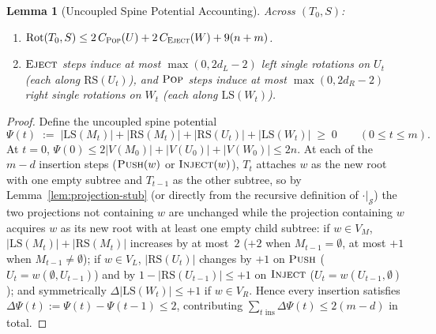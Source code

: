 \documentclass[11pt]{article}
\newtheorem{lemma}[theorem]{Lemma}
\theoremstyle{definition}
\theoremstyle{remark}
\newcommand{\LS}{\mathrm{LS}}
\newcommand{\RS}{\mathrm{RS}}
\newcommand{\Rot}{\mathrm{Rot}}
\newcommand{\PUSH}{\textnormal{\scshape Push}}
\newcommand{\POP}{\textnormal{\scshape Pop}}
\newcommand{\INJECT}{\textnormal{\scshape Inject}}
\newcommand{\EJECT}{\textnormal{\scshape Eject}}
\begin{document}
\begin{lemma}[Uncoupled Spine Potential Accounting]
\label{lem:spine-accounting}
Across $(T_0, S)$:
\begin{enumerate}[label=(\arabic*)]
  \item $\Rot(T_0, S) \le 2\,C_{\POP}(U) + 2\,C_{\EJECT}(W) + 9(n + m)$.
  \item $\EJECT$ steps induce at most $\max(0, 2d_L - 2)$ left single rotations on $U_t$ (each along $\RS(U_t)$), and $\POP$ steps induce at most $\max(0, 2d_R - 2)$ right single rotations on $W_t$ (each along $\LS(W_t)$).
\end{enumerate}
\end{lemma}

\begin{proof}
Define the uncoupled spine potential
\[
\Psi(t) \;:=\; |\LS(M_t)| + |\RS(M_t)| + |\RS(U_t)| + |\LS(W_t)| \;\ge\; 0 \qquad (0 \le t \le m).
\]
At $t = 0$, $\Psi(0) \le 2|V(M_0)| + |V(U_0)| + |V(W_0)| \le 2n$. At each of the $m - d$ insertion steps ($\PUSH(w)$ or $\INJECT(w)$), $T_t$ attaches $w$ as the new root with one empty subtree and $T_{t-1}$ as the other subtree, so by Lemma~\ref{lem:projection-stub} (or directly from the recursive definition of $\cdot|_{\mathcal{S}}$) the two projections not containing $w$ are unchanged while the projection containing $w$ acquires $w$ as its new root with at least one empty child subtree: if $w \in V_M$, $|\LS(M_t)| + |\RS(M_t)|$ increases by at most~$2$ ($+2$ when $M_{t-1} = \emptyset$, at most $+1$ when $M_{t-1} \ne \emptyset$); if $w \in V_L$, $|\RS(U_t)|$ changes by $+1$ on $\PUSH$ ($U_t = w(\emptyset, U_{t-1})$) and by $1 - |\RS(U_{t-1})| \le +1$ on $\INJECT$ ($U_t = w(U_{t-1}, \emptyset)$); and symmetrically $\Delta|\LS(W_t)| \le +1$ if $w \in V_R$. Hence every insertion satisfies $\Delta\Psi(t) := \Psi(t) - \Psi(t - 1) \le 2$, contributing $\sum_{t\text{ ins}} \Delta\Psi(t) \le 2(m - d)$ in total.


\end{proof}
\end{document}
